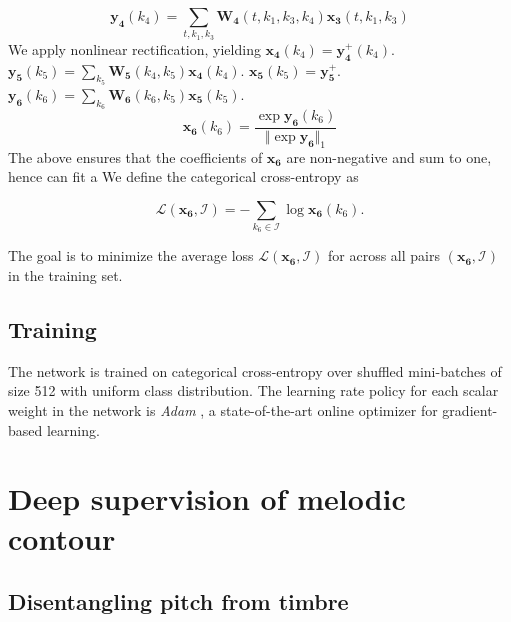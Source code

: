 \documentclass{article}
\begin{document}
\begin{equation}
\boldsymbol{y_4}(k_4) =
\sum_{t,k_1,k_3}
\boldsymbol{W_4}(t, k_1, k_3, k_4)
\boldsymbol{x_3}(t, k_1, k_3)
\end{equation}
We apply nonlinear rectification, yielding $\boldsymbol{x_4}(k_4) = \boldsymbol{y_4^{+}}(k_4)$. $\boldsymbol{y_5}(k_5) = \sum_{k_5} \boldsymbol{W_5}(k_4,k_5) \boldsymbol{x_4}(k_4)$. $\boldsymbol{x_5}(k_5) = \boldsymbol{y_5^{+}}$. $\boldsymbol{y_6}(k_6) = \sum_{k_6} \boldsymbol{W_6}(k_6,k_5) \boldsymbol{x_5}(k_5)$.
\begin{equation}
\boldsymbol{x_6}(k_6) =
\dfrac{\exp \boldsymbol{y_6}(k_6)}
{ \Vert \! \exp \boldsymbol{y_6} \Vert_1}
\end{equation}
The above ensures that the coefficients of $\boldsymbol{x_6}$ are non-negative and sum to one, hence can fit a 
We define the categorical cross-entropy as

\begin{equation}
\mathscr{L}(\boldsymbol{x_6}, \mathcal{I}) =
- \sum_{k_6 \in \mathcal{I}} \log \boldsymbol{x_6}(k_6).
\end{equation}

The goal is to minimize the average loss $\mathscr{L}(\boldsymbol{x_6}, \mathcal{I})$ for across all pairs $(\boldsymbol{x_6}, \mathcal{I})$ in the training set.

\subsection{Training}
The network is trained on categorical cross-entropy over shuffled mini-batches of size 512 with uniform class distribution. The learning rate policy for each scalar weight in the network is  \emph{Adam} \cite{Kingma2015}, a state-of-the-art online optimizer for gradient-based learning.


\section{Deep supervision of melodic contour}
\subsection{Disentangling pitch from timbre}
\end{document}
